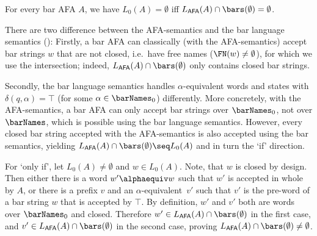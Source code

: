 \documentclass[10pt, final, conference, a4paper, twocolumn]{IEEEtran}
\renewcommand{\enquote}[1]{`#1'}
\begin{document}
\begin{lem}\label{lem:afaequivalence}
  For every bar AFA $A$, we have $L_0(A) = \emptyset$ iff
  $L_{\textsf{\scriptsize AFA}}(A) \cap \bars(\emptyset) = \emptyset$.
\end{lem}
\begin{IEEEproof}
  There are two difference between the AFA-semantics and the bar language semantics ():
  Firstly, a bar AFA can classically (with the AFA-semantics) accept bar strings $w$ that are not closed, i.e.~have
  free names ($\FN(w) \neq \emptyset$), for which we use the intersection; indeed, $L_{\textsf{\scriptsize AFA}}(A)
  \cap \bars(\emptyset)$ only contains closed bar strings. 
  
  Secondly, the bar language semantics handles $\alpha$-equivalent words and
  states with $\delta(q, \alpha) = \top$ (for some $\alpha \in \barNames_0$) differently.  More concretely, with the
  AFA-semantics, a bar AFA can only accept bar strings over $\barNames_0$, not over $\barNames$, which is possible
  using the bar language semantics. However, every closed bar string accepted with the AFA-semantics is also accepted
  using the bar semantics, yielding $L_{\textsf{\scriptsize AFA}}(A) \cap \bars(\emptyset) \seq L_0(A)$ and in turn the
  \enquote{if} direction.

  For \enquote{only if}, let $L_0(A) \neq \emptyset$ and $w \in L_0(A)$. Note, that $w$ is closed by design.
  Then either there is a word $w' \alphaequiv w$ such that $w'$ is accepted in whole by $A$, or there
  is a prefix $v$ and an $\alpha$-equivalent~$v'$ such that $v'$ is the pre-word of a bar string $w$ that is accepted
  by $\top$. By definition, $w'$ and $v'$ both are words over $\barNames_0$ and closed.
  Therefore $w' \in L_{\textsf{\scriptsize AFA}}(A) \cap \bars(\emptyset)$ in the first case, and
  $v' \in L_{\textsf{\scriptsize AFA}}(A) \cap \bars(\emptyset)$ in the second case, proving
  $L_{\textsf{\scriptsize AFA}}(A) \cap \bars(\emptyset) \neq \emptyset$.
\end{IEEEproof}
\end{document}
